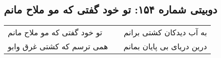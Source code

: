 \begin{center}
\section*{دوبیتی شماره ۱۵۴: تو خود گفتی که مو ملاح مانم}
\label{sec:154}
\begin{longtable}{l p{0.5cm} r}
تو خود گفتی که مو ملاح مانم
&&
به آب دیدکان کشتی برانم
\\
همی ترسم که کشتی غرق وابو
&&
درین دریای بی پایان بمانم
\\
\end{longtable}
\end{center}
